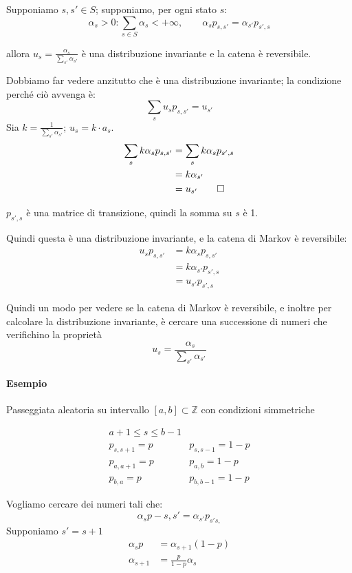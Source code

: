\documentclass[a4paper,12pt]{book}
\begin{document}
Supponiamo $ s,s' \in S $; supponiamo, per ogni stato $ s $:
$$ \alpha_s > 0 : \sum_{s \in S} \alpha_s < + \infty, \qquad \alpha_s p_{s,s'} = \alpha_{s'}p_{s',s} $$ 

allora $ u_s = \frac{\alpha_{s}}{\sum_{s'} \alpha_{s'}} $ è una distribuzione invariante e la catena è reversibile. 

Dobbiamo far vedere anzitutto che è una distribuzione invariante; la condizione perché ciò avvenga è:
$$ \sum_{s} u_s p_{s,s'} = u_{s'} $$
Sia $ k = \frac{1}{\sum_{s'}\alpha_{s'}} $; $ u_s = k \cdot a_s $.
\begin{align*}
	\sum_{s} k\alpha_{s} p_{s,s'} & = \sum_{s} k \alpha_{s} p_{s',s} \\
	& = k \alpha_{s'} \\ 
	& = u_{s'} \qed
\end{align*}

$ p_{s',s} $ è una matrice di transizione, quindi la somma su $ s $ è 1. 

Quindi questa è una distribuzione invariante, e la catena di Markov è reversibile: 
\begin{align*}
u_s p_{s,s'} & = k \alpha_{s} p_{s,s'} \\
	& = k\alpha_{s'} p_{s',s} \\
	& = u_{s'} p_{s',s} 
\end{align*}

Quindi un modo per vedere se la catena di Markov è reversibile, e inoltre per calcolare la distribuzione invariante, è cercare una successione di numeri che verifichino la proprietà 
$$ u_s = \frac{\alpha_{s}}{\sum_{s'} \alpha_{s'}} $$

\paragraph{Esempio} Passeggiata aleatoria su intervallo $ [a, b] \subset \mathbb{Z} $ con condizioni simmetriche

$$ \begin{array}{cc}
	a+1 \le s \le b-1 & \\
	p_{s,s+1} = p & p_{s,s-1} = 1-p \\
	p_{a,a+1} = p & p_{a,b} = 1-p \\
	p_{b,a} = p & p_{b,b-1} = 1-p
\end{array}$$

Vogliamo cercare dei numeri tali che:
	$$ \alpha_{s}p-{s,s'} = \alpha_{s'} p_{s's,} $$
Supponiamo $ s' = s+1 $
\begin{align*}
	\alpha_{s} p & = \alpha_{s+1} (1-p) \\
	\alpha_{s+1} & = \frac{p}{1-p} \alpha_{s}
\end{align*}
\end{document}
